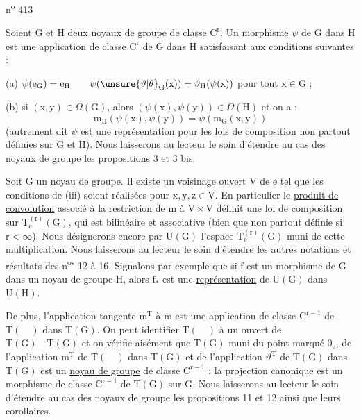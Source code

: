 \hfill n\textsuperscript{o} 413

Soient $\mathrm G$ et $\mathrm H$ deux noyaux de groupe de classe $\mathrm C^{\mathrm r}$. Un \uline{morphisme} $\psi$ de $\mathrm G$ dans $\mathrm H$ est une application de classe $\mathrm C^{\mathrm r}$ de $\mathrm G$ dans $\mathrm H$ satisfaisant aux conditions suivantes :

(a) $\psi(\mathrm e_{\mathrm G})=\mathrm e_{\mathrm H}\qquad\psi(\unsure{\vartheta|\theta}_{\mathrm G}(\mathrm x))=\vartheta_{\mathrm H}(\psi(\mathrm x))$ pour tout $\mathrm x\in\mathrm G$ ;

(b) si $(\mathrm x,\mathrm y)\in\Omega(\mathrm G)$, alors $(\psi(\mathrm x),\psi(\mathrm y))\in\Omega(\mathrm H)$ et on a :
\[
\mathrm m_{\mathrm H}(\psi(\mathrm x),\psi(\mathrm y))=\psi(\mathrm m_{\mathrm G}(\mathrm x,\mathrm y))
\]
(autrement dit $\psi$ est une représentation pour les lois de composition non partout définies sur $\mathrm G$ et $\mathrm H$). Nous laisserons au lecteur le soin d'étendre au cas des noyaux de groupe les propositions 3 et 3 bis.

Soit $\mathrm G$ un noyau de groupe. Il existe un voisinage ouvert $\mathrm V$ de $\mathrm e$ tel que les conditions de (iii) soient réalisées pour $\mathrm x,\mathrm y,\mathrm z\in\mathrm V$. En particulier le \uline{produit de convolution} associé à la restriction de $\mathrm m$ à $\mathrm V\times\mathrm V$ définit une loi de composition sur $\mathrm T_{\mathrm e}^{(\mathrm r)}(\mathrm G)$, qui est bilinéaire et associative (bien que non partout définie si $\mathrm r<\infty$). Nous désignerons encore par $\mathrm U(\mathrm G)$ l'espace $\mathrm T_{\mathrm e}^{(\mathrm r)}(\mathrm G)$ muni de cette multiplication. Nous laisserons au lecteur le soin d'étendre les autres notations et résultats des n\textsuperscript{os} 12 à 16. Signalons par exemple que si $\mathrm f$ est un morphisme de $\mathrm G$ dans un noyau de groupe $\mathrm H$, alors $\mathrm f_{*}$ est une \uline{représentation} de $\mathrm U(\mathrm G)$ dans $\mathrm U(\mathrm H)$.

De plus, l'application tangente $\mathrm m^{\mathrm T}$ à $\mathrm m$ est une application de classe $\mathrm C^{\mathrm r-1}$ de $\mathrm T(\quad)$ dans $\mathrm T(\mathrm G)$. On peut identifier $\mathrm T(\quad)$ à un ouvert de $\mathrm T(\mathrm G)\quad\mathrm T(\mathrm G)$ et on vérifie aisément que $\mathrm T(\mathrm G)$ muni du point marqué $0_{\mathrm e}$, de l'application $\mathrm m^{\mathrm T}$ de $\mathrm T(\quad)$ dans $\mathrm T(\mathrm G)$ et de l'application $\vartheta^{\mathrm T}$ de $\mathrm T(\mathrm G)$ dans $\mathrm T(\mathrm G)$ est un \uline{noyau de groupe} de classe $\mathrm C^{\mathrm r-1}$ ; la projection canonique est un morphisme de classe $\mathrm C^{\mathrm r-1}$ de $\mathrm T(\mathrm G)$ sur $\mathrm G$. Nous laisserons au lecteur le soin d'étendre au cas des noyaux de groupe les propositions 11 et 12 ainsi que leurs corollaires.

